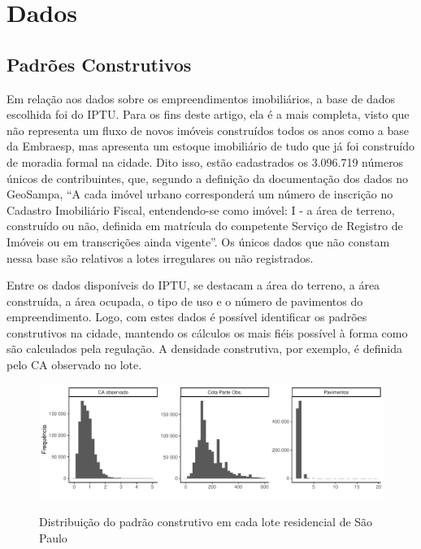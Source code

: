 \chapter{Dados}
\label{chp:dados}

\section{Padrões Construtivos}
\label{sec:dadosIPTU}

Em relação aos dados sobre os empreendimentos imobiliários, a base de dados escolhida foi do IPTU. Para os fins deste artigo, ela é a mais completa, visto que não representa um fluxo de novos imóveis construídos todos os anos como a base da Embraesp, mas apresenta um estoque imobiliário de tudo que já foi construído de moradia formal na cidade. Dito isso, estão cadastrados os 3.096.719 números únicos de contribuintes, que, segundo a definição da documentação dos dados no GeoSampa, ``A cada imóvel urbano corresponderá um número de inscrição no Cadastro Imobiliário Fiscal, entendendo-se como imóvel: I - a área de terreno, construído ou não, definida em matrícula do competente Serviço de Registro de Imóveis ou em transcrições ainda vigente''. Os únicos dados que não constam nessa base são relativos a lotes irregulares ou não registrados.

Entre os dados disponíveis do IPTU, se destacam a área do terreno, a área construída, a área ocupada, o tipo de uso e o número de pavimentos do empreendimento. Logo, com estes dados é possível identificar os padrões construtivos na cidade, mantendo os cálculos os mais fiéis possível à forma como são calculados pela regulação. A densidade construtiva, por exemplo, é definida pelo CA observado no lote. 

\begin{figure}[h]
    \centering
    \caption{Distribuição do padrão construtivo em cada lote residencial de São Paulo}
    \includegraphics[width = \linewidth]{figuras/indicadores.pdf}
    \label{fig:histogramas}
\end{figure}

